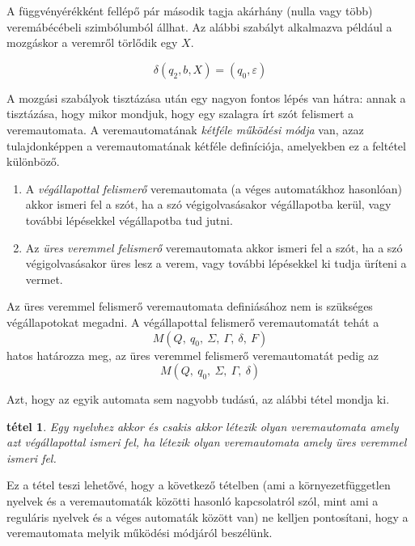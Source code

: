 \documentclass[a4paper]{article}
\newtheorem{tetel}{tétel}[section]
\begin{document}
A függvényérékként fellépő pár második tagja akárhány (nulla vagy több)
veremábécébeli szimbólumból állhat. Az alábbi szabályt alkalmazva
például a mozgáskor a veremről törlődik egy $X$.

\begin{equation*}
    \delta(q_2, b, X) = (q_0, \varepsilon)
\end{equation*}

A mozgási szabályok tisztázása után egy nagyon fontos lépés van hátra:
annak a tisztázása, hogy mikor mondjuk, hogy egy szalagra írt szót
felismert a veremautomata.
A veremautomatának \emph{kétféle működési módja} van, azaz
tulajdonképpen a veremautomatának kétféle definíciója, amelyekben ez a
feltétel különböző.
\begin{enumerate}
    \item A \emph{végállapottal felismerő} veremautomata (a véges
        automatákhoz hasonlóan) akkor ismeri fel a szót, ha a szó
        végigolvasásakor végállapotba kerül, vagy további lépésekkel
        végállapotba tud jutni.
    \item Az \emph{üres veremmel felismerő} veremautomata akkor ismeri
        fel a szót, ha a szó végigolvasásakor üres lesz a verem, vagy
        további lépésekkel ki tudja üríteni a vermet.
\end{enumerate}

Az üres veremmel felismerő veremautomata definiásához  nem is szükséges
végállapotokat megadni. A végállapottal felismerő veremautomatát tehát a
\begin{equation*}
    M(Q,\: q_0,\: \Sigma,\: \Gamma,\: \delta,\: F)
\end{equation*}
hatos határozza meg, az üres veremmel felismerő veremautomatát pedig az
\begin{equation*}
    M(Q,\: q_0,\: \Sigma,\: \Gamma,\: \delta)
\end{equation*}

Azt, hogy az egyik automata sem nagyobb tudású, az alábbi tétel mondja
ki.

\begin{tetel}
    Egy nyelvhez akkor és csakis akkor létezik olyan veremautomata amely
    azt végállapottal ismeri fel, ha létezik olyan veremautomata amely
    üres veremmel ismeri fel.
\end{tetel}

Ez a tétel teszi lehetővé, hogy a következő tételben (ami a
környezetfüggetlen nyelvek és a veremautomaták közötti hasonló
kapcsolatról szól, mint ami a reguláris nyelvek és a véges automaták
között van) ne kelljen pontosítani, hogy a veremautomata melyik működési
módjáról beszélünk.
\end{document}
